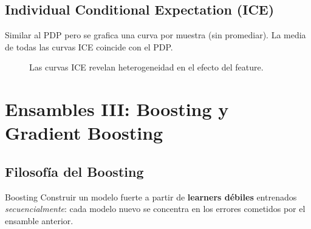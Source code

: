 \documentclass[12pt, a4paper]{article}
\begin{document}
\subsection{Individual Conditional Expectation (ICE)}

Similar al PDP pero se grafica una curva por muestra (sin promediar).
La media de todas las curvas ICE coincide con el PDP.

\begin{figure}[H]
	\centering
	\caption{Las curvas ICE revelan heterogeneidad en el efecto del feature.}
\end{figure}

\section{Ensambles III: Boosting y Gradient Boosting}

\subsection{Filosofía del Boosting}

\begin{defbox}{Boosting}
	Construir un modelo fuerte a partir de \textbf{learners débiles} entrenados
	\emph{secuencialmente}: cada modelo nuevo se concentra en los errores cometidos
	por el ensamble anterior.
\end{defbox}
\end{document}
